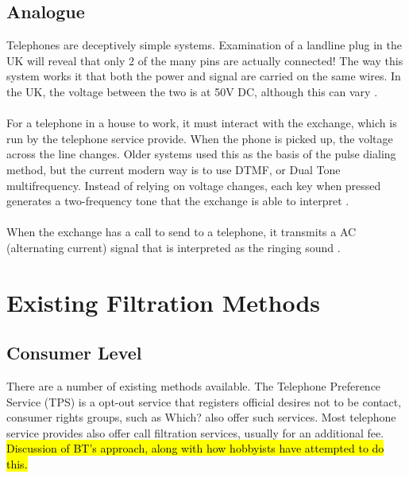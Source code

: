 \documentclass[12pt,a4paper]{report}
\begin{document}
\subsection{Analogue}
Telephones are deceptively simple systems. Examination of a landline plug in the UK will reveal that only 2 of the many pins are actually connected! The way this system works it that both the power and signal are carried on the same wires. In the UK, the voltage between the two is at 50V DC, although this can vary \cite{telephone}.
\\\\
For a telephone in a house to work, it must interact with the exchange, which is run by the telephone service provide. When the phone is picked up, the voltage across the line changes. Older systems used this as the basis of the pulse dialing method, but the current modern way is to use DTMF, or Dual Tone multifrequency. Instead of relying on voltage changes, each key when pressed generates a two-frequency tone that the exchange is able to interpret \cite{telephone}.
\\\\
When the exchange has a call to send to a telephone, it transmits a AC (alternating current) signal that is interpreted as the ringing sound \cite{telephone}.

\section{Existing Filtration Methods}
\subsection{Consumer Level}
There are a number of existing methods available. The Telephone Preference Service (TPS) \cite{tps} is a opt-out service that registers official desires not to be contact, consumer rights groups, such as Which? \cite{which} also offer such services. Most telephone service provides also offer call filtration services, usually for an additional fee. \hl{Discussion of BT's approach, along with how hobbyists have attempted to do this.}
\end{document}
